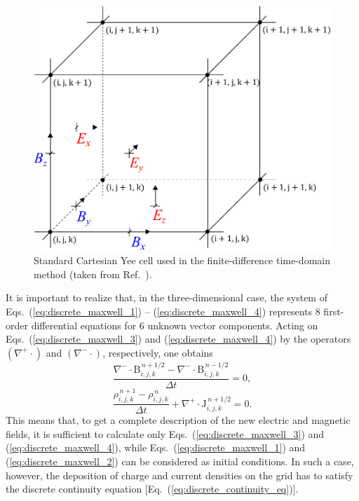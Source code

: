 \documentclass[10pt, a4paper, twoside, openright]{report}
\renewcommand{\vec}[1]{\boldsymbol{\mathrm{#1}}}
\begin{document}
\begin{figure}[t]
	\includegraphics[width=0.35\paperwidth]{./img/yee.pdf}
	\caption[]{\label{fig:yee_lattice} Standard Cartesian Yee cell used in the finite-difference time-domain method (taken from Ref.~).}
\end{figure}

It is important to realize that, in the three-dimensional case, the system of Eqs.~(\ref{eq:discrete_maxwell_1}) -- (\ref{eq:discrete_maxwell_4}) represents 8 first-order differential equations for 6 unknown vector components. Acting on Eqs.~(\ref{eq:discrete_maxwell_3}) and (\ref{eq:discrete_maxwell_4}) by the operators $ \left(\nabla^{+}\cdot\right) $ and $ \left(\nabla^{-}\cdot\right) $, respectively, one obtains
\begin{equation}\label{eq:discrete_eq_for_B}
	\frac{\nabla^{-} \cdot \vec{B}_{i, j, k}^{\,n + 1/2} - \nabla^{-} \cdot \vec{B}_{i, j, k}^{\,n - 1/2}}{\Delta t} = 0,
\end{equation}
\begin{equation}\label{eq:discrete_continuity_eq}
	\frac{\rho_{i, j, k}^{\,n + 1} - \rho_{i, j, k}^{\,n}}{\Delta t} + \nabla^{+} \cdot \vec{J}_{i, j, k}^{\,n + 1/2} = 0.
\end{equation}
This means that, to get a complete description of the new electric and magnetic fields, it is sufficient to calculate only Eqs.~(\ref{eq:discrete_maxwell_3}) and (\ref{eq:discrete_maxwell_4}), while Eqs.~(\ref{eq:discrete_maxwell_1}) and (\ref{eq:discrete_maxwell_2}) can be considered as initial conditions. In such a case, however, the deposition of charge and current densities on the grid has to satisfy the discrete continuity equation [Eq.~(\ref{eq:discrete_continuity_eq})].
\end{document}
